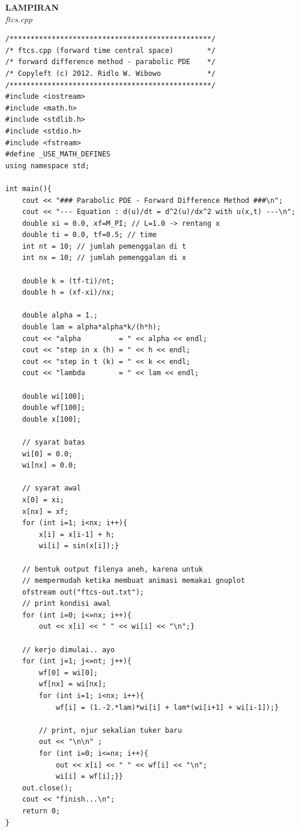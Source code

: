 \documentclass[paper=a4, fontsize=11pt]{scrartcl}
\numberwithin{equation}{section} %
\numberwithin{figure}{section} %
\numberwithin{table}{section} %
\begin{document}
\newpage
\large \textbf{LAMPIRAN} \\
\large \textit{ftcs.cpp}
\lstset{frameround=fttt}
\begin{lstlisting}
/************************************************/
/* ftcs.cpp (forward time central space)        */
/* forward difference method - parabolic PDE    */
/* Copyleft (c) 2012. Ridlo W. Wibowo           */
/************************************************/
#include <iostream>
#include <math.h>
#include <stdlib.h>
#include <stdio.h>
#include <fstream>
#define _USE_MATH_DEFINES
using namespace std;

int main(){
    cout << "### Parabolic PDE - Forward Difference Method ###\n";
    cout << "--- Equation : d(u)/dt = d^2(u)/dx^2 with u(x,t) ---\n";
    double xi = 0.0, xf=M_PI; // L=1.0 -> rentang x
    double ti = 0.0, tf=0.5; // time
    int nt = 10; // jumlah pemenggalan di t
    int nx = 10; // jumlah pemenggalan di x

    double k = (tf-ti)/nt;
    double h = (xf-xi)/nx;
    
    double alpha = 1.;
    double lam = alpha*alpha*k/(h*h);
    cout << "alpha         = " << alpha << endl;
    cout << "step in x (h) = " << h << endl;
    cout << "step in t (k) = " << k << endl;
    cout << "lambda        = " << lam << endl;

    double wi[100];
    double wf[100];
    double x[100];

    // syarat batas
    wi[0] = 0.0;
    wi[nx] = 0.0;
    
    // syarat awal
    x[0] = xi;
    x[nx] = xf;
    for (int i=1; i<nx; i++){
        x[i] = x[i-1] + h;
        wi[i] = sin(x[i]);}
    
    // bentuk output filenya aneh, karena untuk 
    // mempermudah ketika membuat animasi memakai gnuplot
    ofstream out("ftcs-out.txt");
    // print kondisi awal
    for (int i=0; i<=nx; i++){
        out << x[i] << " " << wi[i] << "\n";}
    
    // kerjo dimulai.. ayo
    for (int j=1; j<=nt; j++){
        wf[0] = wi[0];
        wf[nx] = wi[nx];
        for (int i=1; i<nx; i++){
            wf[i] = (1.-2.*lam)*wi[i] + lam*(wi[i+1] + wi[i-1]);}
        
        // print, njur sekalian tuker baru
        out << "\n\n" ;
        for (int i=0; i<=nx; i++){
            out << x[i] << " " << wf[i] << "\n";
            wi[i] = wf[i];}}
    out.close(); 
    cout << "finish...\n";
    return 0;
}
\end{lstlisting}
\end{document}
